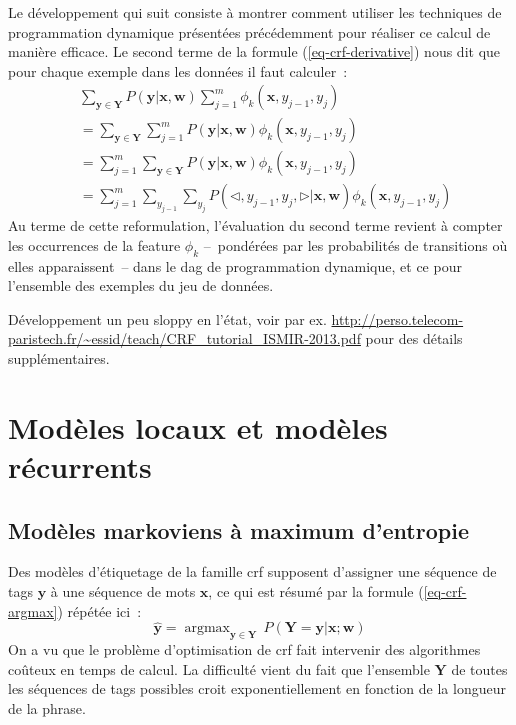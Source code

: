 \documentclass[11pt,openany]{book}
\newcommand{\ac}[1]{{\sc #1}} %
\begin{document}
Le développement qui suit consiste à montrer comment utiliser les techniques de programmation dynamique présentées précédemment pour réaliser ce calcul de manière efficace.  Le second terme de la formule (\ref{eq-crf-derivative}) nous dit que pour chaque exemple dans les données il faut calculer~:
\begin{align}
&\sum_{\mathbf{y}\in \mathbf{Y}} P(\mathbf{y}|\mathbf{x},\mathbf{w}) \sum_{j=1}^m \phi_k(\mathbf{x},y_{j-1},y_j)\\
&=\sum_{\mathbf{y}\in \mathbf{Y}} \sum_{j=1}^m P(\mathbf{y}|\mathbf{x},\mathbf{w})  \phi_k(\mathbf{x},y_{j-1},y_j)\\
&= \sum_{j=1}^m \sum_{\mathbf{y}\in \mathbf{Y}} P(\mathbf{y}|\mathbf{x},\mathbf{w})  \phi_k(\mathbf{x},y_{j-1},y_j)\\
&=  \sum_{j=1}^m \sum_{y_{j-1}}\sum_{y_j} P(\lhd,y_{j-1},y_j,\rhd|\mathbf{x},\mathbf{w})  \phi_k(\mathbf{x},y_{j-1},y_j)
\end{align}
Au terme de cette reformulation, l'évaluation du second terme revient à compter les occurrences de la feature $\phi_k$ --~pondérées par les probabilités de transitions où elles apparaissent~-- dans le \ac{dag} de programmation dynamique, et ce pour l'ensemble des exemples du jeu de données.

{\color{red} Développement un peu sloppy en l'état, voir par ex.
\url{http://perso.telecom-paristech.fr/~essid/teach/CRF_tutorial_ISMIR-2013.pdf}
pour des détails supplémentaires.}




\chapter{Modèles locaux et modèles récurrents}


\section{Modèles markoviens à maximum d'entropie}

Des modèles d'étiquetage de la famille {\sc crf} supposent d'assigner une séquence de tags
$\mathbf{y}$ à une séquence de mots $\mathbf{x}$, ce qui est résumé par la formule (\ref{eq-crf-argmax})
répétée ici~:
\begin{equation}
\hat{\mathbf{y}} =  \mathop{\text{argmax}}_{\mathbf{y}\in \mathbf{Y}}
\, P(\mathbf{Y}=\mathbf{y} | \mathbf{x} ; \mathbf{w})
\end{equation}
On a vu que le problème d'optimisation de {\sc crf} fait intervenir des algorithmes coûteux en temps de calcul. 
La difficulté vient du fait que l'ensemble $\mathbf{Y}$ de toutes les séquences de tags possibles croit exponentiellement en 
fonction de la longueur de la phrase.
\end{document}
